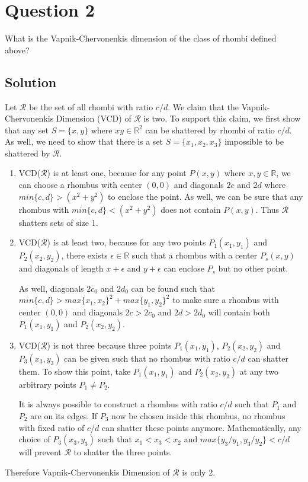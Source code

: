 
\section*{Question 2}

What is the Vapnik-Chervonenkis dimension of the class of rhombi defined above?

\subsection*{Solution}

Let $\mathcal{R}$ be the set of all rhombi with ratio $c/d$.
We claim that the Vapnik-Chervonenkis Dimension  (VCD) of $\mathcal{R}$ is two.
To support this claim, we first show that any set $ S = \{x, y\}$ where $x y \in \mathbb{R}^2$ can be shattered by rhombi of ratio $c/d$.
As well, we need to show that there is a set $S = \{x_1, x_2, x_3\}$ impossible to be shattered by $\mathcal{R}$.

\begin{enumerate}
\item VCD($\mathcal{R}$) is at least one, because for any point $P(x,y)$ where $x, y \in \mathbb{R}$, we can choose a rhombus with center $(0,0)$ and diagonals $2c$ and $2d$ where $min\{c,d\} > (x^2 + y^2)$ to enclose the point.
As well, we can be sure that any rhombus with $min\{c,d\} < (x^2 + y^2)$ does not contain $P(x,y)$.
Thus $\mathcal{R}$ shatters sets of size 1.

\item VCD($\mathcal{R}$) is at least two, because for any two points $P_1(x_1,y_1)$ and $P_2(x_2,y_2)$, there exists $\epsilon \in \mathbb{R}$ such that a rhombus with a center $P_s(x,y)$ and diagonals of length $x+\epsilon$ and $y+\epsilon$ can enclose $P_s$ but no other point.

As well, diagonals $2c_0$ and $2d_0$ can be found such that $min\{c,d\} > max\{x_1,x_2\}^2 + max\{y_1, y_2\}^2$ to make sure a rhombus with center $(0,0)$ and diagonals $2c > 2c_0$ and $2d > 2d_0$ will contain both $P_1(x_1,y_1)$ and $P_2(x_2,y_2)$.

\item VCD($\mathcal{R}$) is not three because three points $P_1(x_1,y_1)$, $P_2(x_2,y_2)$ and $P_3(x_3,y_3)$ can be given such that no rhombus with ratio $c/d$ can shatter them.
To show this point, take $P_1(x_1,y_1)$ and $P_2(x_2,y_2)$ at any two arbitrary points $P_1 \neq P_2$.

It is always possible to construct a rhombus with ratio $c/d$ such that $P_1$ and $P_2$ are on its edges.
If $P_3$ now be chosen inside this rhombus, no rhombus with fixed ratio of $c/d$ can shatter these points anymore.
Mathematically, any choice of $P_3(x_3,y_3)$ such that $x_1 < x_3 < x_2$ and $max\{y_3/y_1, y_3/y_2\} < c/d$ will prevent $\mathcal{R}$ to shatter the three points.
\end{enumerate}

Therefore Vapnik-Chervonenkis Dimension of $\mathcal{R}$ is only 2.
